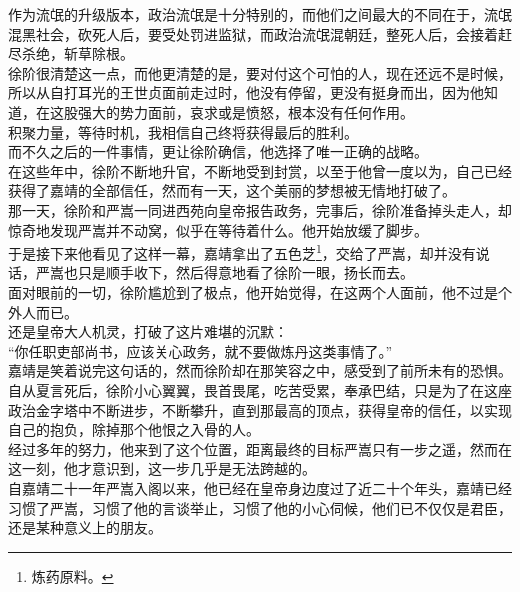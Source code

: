 \begin{multicols}{\theparacolNo}
作为流氓的升级版本，政治流氓是十分特别的，而他们之间最大的不同在于，流氓混黑社会，砍死人后，要受处罚进监狱，而政治流氓混朝廷，整死人后，会接着赶尽杀绝，斩草除根。\\

徐阶很清楚这一点，而他更清楚的是，要对付这个可怕的人，现在还远不是时候，所以从自打耳光的王世贞面前走过时，他没有停留，更没有挺身而出，因为他知道，在这股强大的势力面前，哀求或是愤怒，根本没有任何作用。\\

积聚力量，等待时机，我相信自己终将获得最后的胜利。\\

而不久之后的一件事情，更让徐阶确信，他选择了唯一正确的战略。\\

在这些年中，徐阶不断地升官，不断地受到封赏，以至于他曾一度以为，自己已经获得了嘉靖的全部信任，然而有一天，这个美丽的梦想被无情地打破了。\\

那一天，徐阶和严嵩一同进西苑向皇帝报告政务，完事后，徐阶准备掉头走人，却惊奇地发现严嵩并不动窝，似乎在等待着什么。他开始放缓了脚步。\\

于是接下来他看见了这样一幕，嘉靖拿出了五色芝\footnote{炼药原料。}，交给了严嵩，却并没有说话，严嵩也只是顺手收下，然后得意地看了徐阶一眼，扬长而去。\\

面对眼前的一切，徐阶尴尬到了极点，他开始觉得，在这两个人面前，他不过是个外人而已。\\

还是皇帝大人机灵，打破了这片难堪的沉默：\\

“你任职吏部尚书，应该关心政务，就不要做炼丹这类事情了。”\\

嘉靖是笑着说完这句话的，然而徐阶却在那笑容之中，感受到了前所未有的恐惧。\\

自从夏言死后，徐阶小心翼翼，畏首畏尾，吃苦受累，奉承巴结，只是为了在这座政治金字塔中不断进步，不断攀升，直到那最高的顶点，获得皇帝的信任，以实现自己的抱负，除掉那个他恨之入骨的人。\\

经过多年的努力，他来到了这个位置，距离最终的目标严嵩只有一步之遥，然而在这一刻，他才意识到，这一步几乎是无法跨越的。\\

自嘉靖二十一年严嵩入阁以来，他已经在皇帝身边度过了近二十个年头，嘉靖已经习惯了严嵩，习惯了他的言谈举止，习惯了他的小心伺候，他们已不仅仅是君臣，还是某种意义上的朋友。\\


\end{multicols}
